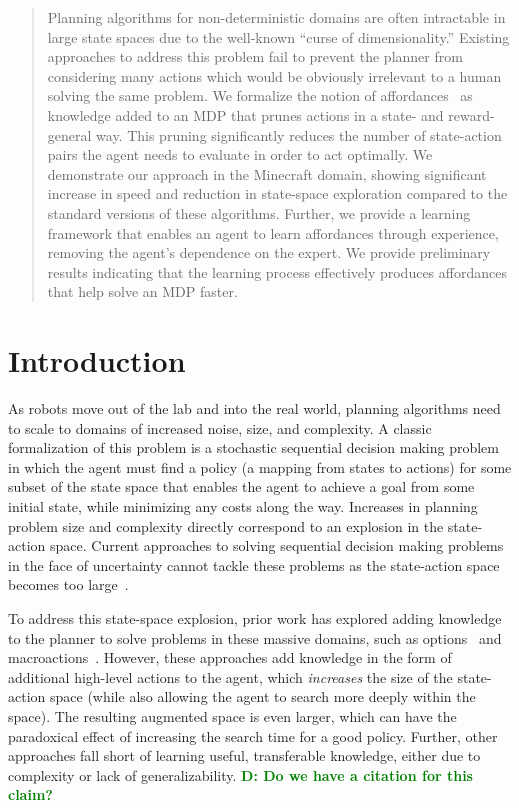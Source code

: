 \documentclass[conference]{IEEEtran}
\newcommand{\dnote}[1]{\textcolor{Green}{\textbf{D: #1}}}
\begin{document}
\begin{abstract}
Planning algorithms for non-deterministic domains are often
intractable in large state spaces due to the well-known ``curse of
dimensionality.'' Existing approaches to address this problem fail to
prevent the planner from considering many actions which would be
obviously irrelevant to a human solving the same problem.  We
formalize the notion of affordances~\citep{gibson77} as knowledge
added to an MDP that prunes actions in a state- and reward- general
way. This pruning significantly reduces the number of state-action
pairs the agent needs to evaluate in order to act optimally. We
demonstrate our approach in the Minecraft domain, showing significant
increase in speed and reduction in state-space exploration compared to
the standard versions of these algorithms. Further, we provide a
learning framework that enables an agent to learn affordances through
experience, removing the agent's dependence on the expert. We provide
preliminary results indicating that the learning process effectively
produces affordances that help solve an MDP faster.
\end{abstract}

\IEEEpeerreviewmaketitle

\section{Introduction}
\label{sec:introduction}
As robots move out of the lab and into the real world, planning
algorithms need to scale to domains of increased noise, size, and
complexity.  A classic formalization of this problem is a stochastic
sequential decision making problem in which the agent must find a
policy (a mapping from states to actions) for some subset of the state
space that enables the agent to achieve a goal from some initial
state, while minimizing any costs along the way.
Increases in planning problem size and complexity directly correspond
to an explosion in the state-action space. Current approaches to solving 
sequential decision making problems in the face of uncertainty cannot tackle these problems 
as the state-action space becomes too large~\citep{grounds05}.

To address this state-space explosion, prior work has explored adding
knowledge to the planner to solve problems in these
massive domains, such as options~\citep{sutton99} and
macroactions~\citep{Botea:2005kx,Newton:2005vn}. However, these
approaches add knowledge in the form of additional high-level actions
to the agent, which {\em increases} the size of the state-action space
(while also allowing the agent to search more deeply within the
space).  The resulting augmented space is even larger, which can have
the paradoxical effect of increasing the search time for a good
policy. Further, other approaches fall short of learning useful, transferable knowledge,
either due to complexity or lack of generalizability. \dnote{Do we have a citation for this claim?}
\end{document}
